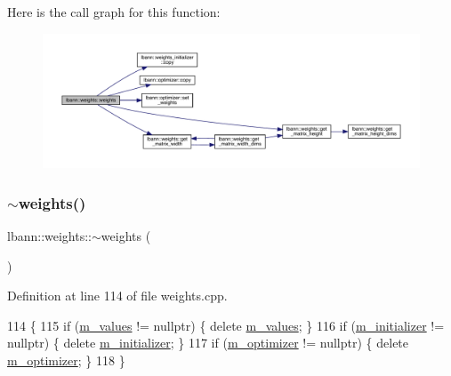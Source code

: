 Here is the call graph for this function\+:\nopagebreak
\begin{figure}[H]
\begin{center}
\leavevmode
\includegraphics[width=350pt]{classlbann_1_1weights_ab7cca67d4459f3ba6a72dae4bb8d5cc6_cgraph}
\end{center}
\end{figure}
\mbox{\label{classlbann_1_1weights_a82334405491bee7a2e2a1295dcb94134}} 
\subsubsection{\texorpdfstring{$\sim$weights()}{~weights()}}
{\footnotesize\ttfamily lbann\+::weights\+::$\sim$weights (\begin{DoxyParamCaption}{ }\end{DoxyParamCaption})\hspace{0.3cm}{\ttfamily [virtual]}}



Definition at line 114 of file weights.\+cpp.


\begin{DoxyCode}
114                   \{
115   \textcolor{keywordflow}{if} (\hyperlink{classlbann_1_1weights_a6b2df671b6d4c4dd595477971eea0543}{m\_values} != \textcolor{keyword}{nullptr})      \{ \textcolor{keyword}{delete} \hyperlink{classlbann_1_1weights_a6b2df671b6d4c4dd595477971eea0543}{m\_values}; \}
116   \textcolor{keywordflow}{if} (\hyperlink{classlbann_1_1weights_a3ddbcce8d543e975efeebdb43e82444c}{m\_initializer} != \textcolor{keyword}{nullptr}) \{ \textcolor{keyword}{delete} \hyperlink{classlbann_1_1weights_a3ddbcce8d543e975efeebdb43e82444c}{m\_initializer}; \}
117   \textcolor{keywordflow}{if} (\hyperlink{classlbann_1_1weights_a5f3b4d4a3ad390c2a9bdbe6c4971de65}{m\_optimizer} != \textcolor{keyword}{nullptr})   \{ \textcolor{keyword}{delete} \hyperlink{classlbann_1_1weights_a5f3b4d4a3ad390c2a9bdbe6c4971de65}{m\_optimizer}; \}
118 \}
\end{DoxyCode}


